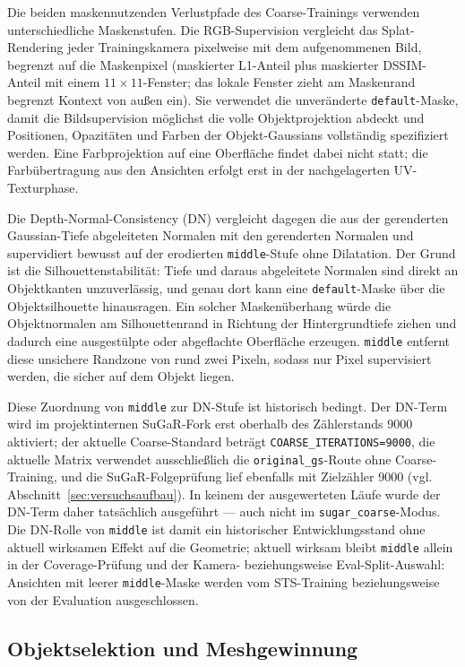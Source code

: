 Die beiden maskennutzenden Verlustpfade des Coarse-Trainings verwenden
unterschiedliche Maskenstufen. Die RGB-Supervision vergleicht das
Splat-Rendering jeder Trainingskamera pixelweise mit dem aufgenommenen Bild,
begrenzt auf die Maskenpixel (maskierter L1-Anteil plus maskierter
DSSIM-Anteil mit einem $11\times11$-Fenster; das lokale Fenster zieht am
Maskenrand begrenzt Kontext von außen ein). Sie verwendet die unveränderte
\texttt{default}-Maske, damit die Bildsupervision möglichst die volle
Objektprojektion abdeckt und Positionen, Opazitäten und Farben der
Objekt-Gaussians vollständig spezifiziert werden. Eine Farbprojektion auf
eine Oberfläche findet dabei nicht statt; die Farbübertragung aus den
Ansichten erfolgt erst in der nachgelagerten UV-Texturphase.

Die Depth-Normal-Consistency (DN) vergleicht dagegen die aus der gerenderten
Gaussian-Tiefe abgeleiteten Normalen mit den gerenderten Normalen und
supervidiert bewusst auf der erodierten \texttt{middle}-Stufe ohne Dilatation.
Der Grund ist die Silhouettenstabilität: Tiefe und daraus abgeleitete
Normalen sind direkt an Objektkanten unzuverlässig, und genau dort kann eine
\texttt{default}-Maske über die Objektsilhouette hinausragen. Ein solcher
Maskenüberhang würde die Objektnormalen am Silhouettenrand in Richtung der
Hintergrundtiefe ziehen und dadurch eine ausgestülpte oder abgeflachte
Oberfläche erzeugen. \texttt{middle} entfernt diese unsichere Randzone von
rund zwei Pixeln, sodass nur Pixel supervisiert werden, die sicher auf dem
Objekt liegen.

Diese Zuordnung von \texttt{middle} zur DN-Stufe ist historisch bedingt.
Der DN-Term wird im projektinternen SuGaR-Fork erst oberhalb des
Zählerstands 9000 aktiviert; der aktuelle Coarse-Standard beträgt
\texttt{COARSE\_ITERATIONS=9000}, die aktuelle Matrix verwendet
ausschließlich die \texttt{original\_gs}-Route ohne Coarse-Training, und die
SuGaR-Folgeprüfung lief ebenfalls mit Zielzähler 9000
(vgl. Abschnitt~\ref{sec:versuchsaufbau}). In keinem der ausgewerteten Läufe
wurde der DN-Term daher tatsächlich ausgeführt — auch nicht im
\texttt{sugar\_coarse}-Modus. Die DN-Rolle von \texttt{middle} ist damit ein
historischer Entwicklungsstand ohne aktuell wirksamen Effekt auf die
Geometrie; aktuell wirksam bleibt \texttt{middle} allein in der
Coverage-Prüfung und der Kamera- beziehungsweise Eval-Split-Auswahl:
Ansichten mit leerer \texttt{middle}-Maske werden vom STS-Training
beziehungsweise von der Evaluation ausgeschlossen.

\subsection{Objektselektion und Meshgewinnung}

